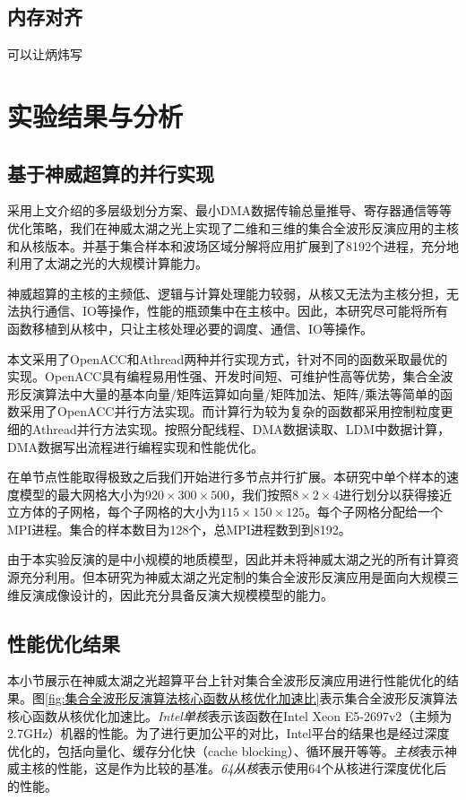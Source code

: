 \documentclass[degree=doctor]{thuthesis}
\begin{document}
\subsection{内存对齐}
可以让炳炜写


\section{实验结果与分析} %
\label{sec:实验结果与分析}

\subsection{基于神威超算的并行实现}

采用上文介绍的多层级划分方案、最小DMA数据传输总量推导、寄存器通信等等优化策略，我们在神威太湖之光上实现了二维和三维的集合全波形反演应用的主核和从核版本。并基于集合样本和波场区域分解将应用扩展到了8192个进程，充分地利用了太湖之光的大规模计算能力。

神威超算的主核的主频低、逻辑与计算处理能力较弱，从核又无法为主核分担，无法执行通信、IO等操作，性能的瓶颈集中在主核中。因此，本研究尽可能将所有函数移植到从核中，只让主核处理必要的调度、通信、IO等操作。

本文采用了OpenACC和Athread两种并行实现方式，针对不同的函数采取最优的实现。OpenACC具有编程易用性强、开发时间短、可维护性高等优势，集合全波形反演算法中大量的基本向量/矩阵运算如向量/矩阵加法、矩阵/乘法等简单的函数采用了OpenACC并行方法实现。而计算行为较为复杂的函数都采用控制粒度更细的Athread并行方法实现。按照分配线程、DMA数据读取、LDM中数据计算，DMA数据写出流程进行编程实现和性能优化。

在单节点性能取得极致之后我们开始进行多节点并行扩展。本研究中单个样本的速度模型的最大网格大小为$920\times 300 \times 500$，我们按照$8\times 2 \times 4$进行划分以获得接近立方体的子网格，每个子网格的大小为$115\times150\times125$。每个子网格分配给一个MPI进程。集合的样本数目为128个，总MPI进程数到到8192。

由于本实验反演的是中小规模的地质模型，因此并未将神威太湖之光的所有计算资源充分利用。但本研究为神威太湖之光定制的集合全波形反演应用是面向大规模三维反演成像设计的，因此充分具备反演大规模模型的能力。

\subsection{性能优化结果}

本小节展示在神威太湖之光超算平台上针对集合全波形反演应用进行性能优化的结果。图\ref{fig:集合全波形反演算法核心函数从核优化加速比}表示集合全波形反演算法核心函数从核优化加速比。\emph{Intel单核}表示该函数在Intel Xeon E5-2697v2（主频为2.7GHz）机器的性能。为了进行更加公平的对比，Intel平台的结果也是经过深度优化的，包括向量化、缓存分化快（cache blocking）、循环展开等等。\emph{主核}表示神威主核的性能，这是作为比较的基准。\emph{64从核}表示使用64个从核进行深度优化后的性能。
\end{document}
